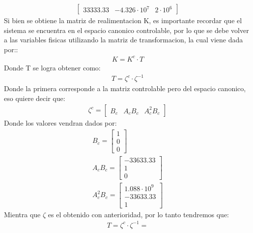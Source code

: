 \documentclass[
  11pt,
  letterpaper,
   addpoints,
   answers
  ]{exam}
\begin{document}
\begin{questions}
\begin{solution}
\begin{align}
\begin{bmatrix}
                33333.33 & -4.326 \cdot 10^{7} & 2 \cdot 10^{6}
            \end{bmatrix}
        \end{align}
        Si bien se obtiene la matriz de realimentacion K, es importante recordar que el sistema se encuentra en el espacio canonico controlable, por lo que se debe volver a las variables fisicas utilizando la matriz de transformacion, la cual viene dada por::
        \begin{align}
            K = K^{c} \cdot T
        \end{align}
        Donde T se logra obtener como:
        \begin{align}
            T = \zeta^{c} \cdot \zeta^{-1}
        \end{align}
        Donde la primera corresponde a la matriz controlable pero del espacio canonico, eso quiere decir que:
        \begin{align}
            \zeta^{c} =
            \begin{bmatrix}
                B_{c} & A_{c}B_{c} & A_{c}^{2}B_{c}
            \end{bmatrix}
        \end{align}
        Donde los valores vendran dados por:
        \begin{align}
            B_{c} = 
            \begin{bmatrix}
                1\\
                0\\
                0
            \end{bmatrix}\\
            A_{c}B_{c} = 
            \begin{bmatrix}
                -33633.33\\
                1\\
                0
            \end{bmatrix}\\
            A_{c}^{2}B_{c} = 
            \begin{bmatrix}
                1.088 \cdot 10^{9}\\
                -33633.33\\
                1
            \end{bmatrix}
        \end{align}
        Mientra que $\zeta$ es el obtenido con anterioridad, por lo tanto tendremos que:
        \begin{align}
            T = \zeta^{c} \cdot \zeta^{-1} =

\end{align}
\end{solution}
\end{questions}
\end{document}
